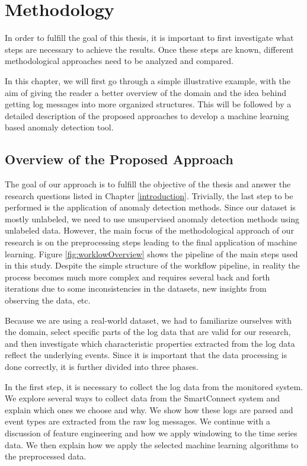 \chapter{Methodology}
\label{methodology}

In order to fulfill the goal of this thesis, it is important to first investigate what steps are necessary to achieve the results. Once these steps are known, different methodological approaches need to be analyzed and compared.

In this chapter, we will first go through a simple illustrative example, with the aim of giving the reader a better overview of the domain and the idea behind getting log messages into more organized structures. This will be followed by a detailed description of the proposed approaches to develop a machine learning based anomaly detection tool.  

\section{Overview of the Proposed Approach}
The goal of our approach is to fulfill the objective of the thesis and answer the research questions listed in Chapter \ref{introduction}. Trivially, the last step to be performed is the application of anomaly detection methods. Since our dataset is mostly unlabeled, we need to use unsupervised anomaly detection methods using unlabeled data. However, the main focus of the methodological approach of our research is on the preprocessing steps leading to the final application of machine learning. Figure \ref{fig:worklowOverview} shows the pipeline of the main steps used in this study. Despite the simple structure of the workflow pipeline, in reality the process becomes much more complex and requires several back and forth iterations due to some inconsistencies in the datasets, new insights from observing the data, etc.

Because we are using a real-world dataset, we had to familiarize ourselves with the domain, select specific parts of the log data that are valid for our research, and then investigate which characteristic properties extracted from the log data reflect the underlying events. Since it is important that the data processing is done correctly, it is further divided into three phases.

In the first step, it is necessary to collect the log data from the monitored system. We explore several ways to collect data from the SmartConnect system and explain which ones we choose and why. We show how these logs are parsed and event types are extracted from the raw log messages. We continue with a discussion of feature engineering and how we apply windowing to the time series data. We then explain how we apply the selected machine learning algorithms to the preprocessed data. 

